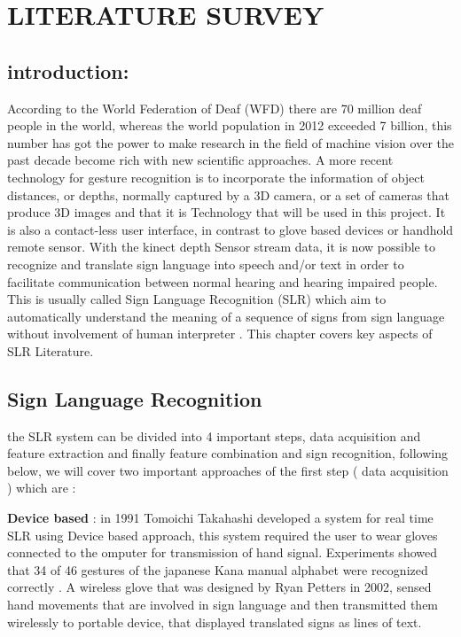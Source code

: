 

\chapter{LITERATURE SURVEY} \label{chapter1}

\section{introduction:} 

According to the World Federation of Deaf (WFD) \cite{wfd} there are 70 million deaf people in the world, whereas the world population in 2012 exceeded 7 billion, this number has got the power to make research in the field of machine vision  over  the  past  decade become rich with new scientific approaches.
A  more  recent   technology  for gesture   recognition  is to  incorporate   the  information   of object   distances,   or depths,   normally   captured   by a 3D camera,   or a set  of cameras  that  produce 3D images and that it is Technology that will be used in this project. It is also a contact-less  user interface,   in contrast   to glove based   devices  or handhold  remote  sensor.
\newline
With the kinect depth Sensor stream data, it is now possible to recognize and  translate sign language into speech and/or text in order to facilitate communication between normal hearing and hearing impaired people. This is usually called Sign Language Recognition (SLR) which  aim  to automatically understand the meaning of a sequence of signs from sign language without involvement of human interpreter \cite{27}. This chapter covers key aspects of SLR Literature.

\section{ Sign  Language Recognition}  

the SLR system can be divided into 4 important  steps, data acquisition and feature extraction and finally feature combination and sign recognition, following below, we will cover two important approaches of the first step ( data acquisition ) which are  :

\textbf{Device based }:
in  1991 Tomoichi Takahashi   developed a system for real time SLR  using Device based approach, this system required the user to wear gloves connected to the omputer for transmission of hand signal. Experiments showed that 34 of 46 gestures of the japanese Kana manual alphabet were recognized correctly \cite{29}
.
A wireless glove that was designed by Ryan Petters  \cite{31}in 2002, sensed hand movements that are involved in sign language and then transmitted them wirelessly to portable device, that displayed translated signs as lines of text.

